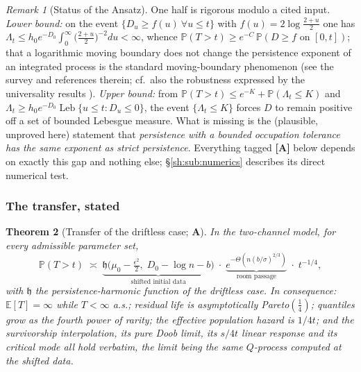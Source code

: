 \documentclass[11pt]{article}
\numberwithin{equation}{section}
\theoremstyle{plain}
\newtheorem{theorem}{Theorem}[section]
\theoremstyle{definition}
\theoremstyle{remark}
\newtheorem{remark}[theorem]{Remark}
\newcommand{\E}{\mathbb{E}}
\newcommand{\PP}{\mathbb{P}}
\DeclareMathOperator{\Leb}{Leb}
\newcommand{\hm}{\mathfrak{h}}
\begin{document}
\begin{remark}[Status of the Ansatz]\label{sh:rem:ansatzstatus}
One half is rigorous modulo a cited input. \emph{Lower bound:} on the event
$\{D_u\ge f(u)\ \forall u\le t\}$ with $f(u)=2\log\frac{2+u}{2}$ one has
$\Lambda_t\le h_0e^{-D_0}\int_0^\infty\bigl(\tfrac{2+u}{2}\bigr)^{-2}du<\infty$,
whence $\PP(T>t)\ge e^{-C}\,\PP(D\ge f\text{ on }[0,t])$; that a logarithmic
moving boundary does not change the persistence exponent of an integrated
process is the standard moving-boundary phenomenon (see the survey
\cite{AS15} and references therein; cf.\ also the robustness expressed
by the universality results \cite{AD13,DW15}). \emph{Upper bound:} from
$\PP(T>t)\le e^{-K}+\PP(\Lambda_t\le K)$ and
$\Lambda_t\ge h_0e^{-D_0}\Leb\{u\le t:D_u\le0\}$, the event
$\{\Lambda_t\le K\}$ forces $D$ to remain positive off a set of bounded
Lebesgue measure. What is missing is the (plausible, unproved here)
statement that \emph{persistence with a bounded occupation tolerance has the
same exponent as strict persistence}. Everything tagged \textbf{[A]} below
depends on exactly this gap and nothing else; \S\ref{sh:sub:numerics}
describes its direct numerical test.
\end{remark}

\subsubsection{The transfer, stated}\label{tc:subsub:transferstated}

\begin{theorem}[Transfer of the driftless case; \textbf{A}]
\label{tc:thm:transfer}
In the two-channel model, for every admissible parameter set,
\begin{equation}\label{tc:eq:transfer}
\PP(T>t)\;\asymp\;\underbrace{\hm\bigl(\mu_{0}-\tfrac{\epsilon^{2}}{2},
\;D_{0}-\log n-b\bigr)}_{\text{shifted initial data}}\;\cdot\;
\underbrace{e^{-\Theta\left(n(b/\sigma)^{2/3}\right)}}_{\text{room
passage}}\;\cdot\;t^{-1/4},
\end{equation}
with $\hm$ the persistence-harmonic function of the driftless case. In
consequence: $\E[T]=\infty$ while $T<\infty$ a.s.; residual life is
asymptotically Pareto$(\tfrac14)$; quantiles grow as the fourth power of
rarity; the effective population hazard is $1/4t$; and the survivorship
interpolation, its pure Doob limit, its $s/4t$ linear response and its
critical mode all hold verbatim, the limit being the same $Q$-process
computed at the shifted data.
\end{theorem}
\end{document}

